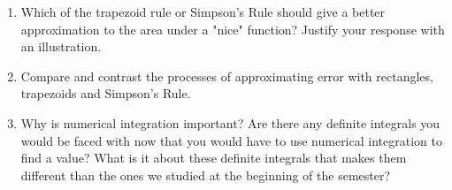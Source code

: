 \begin{enumerate}
\item   Which of the trapezoid rule or Simpson's Rule should give a better approximation to the area under a "nice" function?  Justify your response with an illustration.

\item   Compare and contrast the processes of approximating error with rectangles, trapezoids and Simpson's Rule.

\item   Why is numerical integration important?  Are there any definite integrals you would be faced with now that you would have to use numerical integration to find a value?  What is it about these definite integrals that makes them different than the ones we studied at the beginning of the semester?

\end{enumerate}
